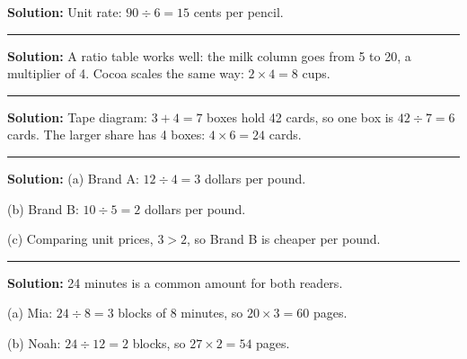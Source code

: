 \documentclass[12pt]{article}
\begin{document}



\textbf{Solution:} Unit rate: $90 \div 6 = 15$ cents per pencil. 

\vspace{0.3cm}\noindent\rule{\linewidth}{0.2pt}\vspace{0.3cm}


\textbf{Solution:} A ratio table works well: the milk column goes from 5 to 20,
a multiplier of 4. Cocoa scales the same way: $2 \times 4 = 8$ cups. 

\vspace{0.3cm}\noindent\rule{\linewidth}{0.2pt}\vspace{0.3cm}


\textbf{Solution:} Tape diagram: $3 + 4 = 7$ boxes hold 42 cards, so one box is
$42 \div 7 = 6$ cards. The larger share has 4 boxes: $4 \times 6 = 24$ cards.

\vspace{0.3cm}\noindent\rule{\linewidth}{0.2pt}\vspace{0.3cm}


\textbf{Solution:} (a) Brand A: $12 \div 4 = 3$ dollars per pound. 

(b) Brand B: $10 \div 5 = 2$ dollars per pound. 

(c) Comparing unit prices, $3 > 2$, so Brand B is cheaper per
pound. 

\vspace{0.3cm}\noindent\rule{\linewidth}{0.2pt}\vspace{0.3cm}


\textbf{Solution:} 24 minutes is a common amount for both readers.

(a) Mia: $24 \div 8 = 3$ blocks of 8 minutes, so $20 \times 3 = 60$ pages.

(b) Noah: $24 \div 12 = 2$ blocks, so $27 \times 2 = 54$ pages. 
\end{document}
